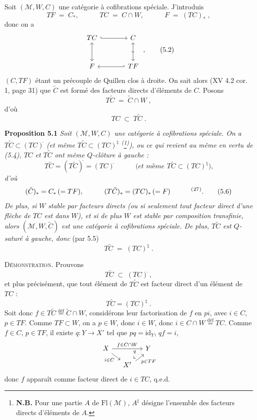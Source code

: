 \documentclass[11pt]{article}
\newcommand{\printedpage}[1]{\marginpar{\footnotesize p.~#1}}
\newcommand{\msp}[1]{\marginpar{\footnotesize [#1]}}
\newcommand{\defeq}{\overset{\text{déf}}{=}}
\newcommand{\fnm}[1]{\textsuperscript{(}\footnotemark[#1]\textsuperscript{)}}
\newcommand{\cl}{^{\tilde{}}}%
\begin{document}
Soit $(\mathcal{M}, W, C)$ une catégorie à cofibrations spéciale. J'introduis
\[
TF \;=\; C_{*}, \qquad\quad TC \;=\; C \cap W, \qquad\quad F \;=\; (TC)_{*} \; ,
\tag*{(5.1)}
\]
donc on a
\[
\begin{tikzcd}[row sep=large, column sep=large]
TC \arrow[r, hook] \arrow[d, leftrightarrow] & C \arrow[d, leftrightarrow, "\shortmid"{marking, sloped}] \\
F & TF \arrow[l, hook']
\end{tikzcd} \; ,
\tag*{(5.2)}
\]
$(C, TF)$ étant un précouple de Quillen clos à droite. On sait alors (XV 4.2 cor. 1, page 31) que $\tilde{C}$ est formé des facteurs directs d'éléments de $C$. Posons
\[
T\tilde{C} \;=\; \tilde{C} \cap W \; ,
\tag*{(5.3)}
\]
d'où
\[
TC \;\subset\; T\tilde{C} \; .
\tag*{(5.4)}
\]

\textbf{Proposition 5.1} \textit{Soit $(\mathcal{M}, W, C)$ une catégorie à cofibrations spéciale. On a $T\tilde{C} \subset (TC)\cl$ (et même $T\tilde{C} \subset (TC)^{\natural}$ \textsuperscript{(}\footnote[26]{\textbf{N.B.} Pour une partie $A$ de $\mathrm{Fl}(\mathcal{M})$, $A^{\natural}$ désigne l'ensemble des facteurs directs d'éléments de $A$.}\textsuperscript{)}), ou ce qui revient au même en vertu de (5.4), $TC$ et $T\tilde{C}$ ont même $Q$-clôture à gauche :}
\[
T\tilde{C} = (T\tilde{C})\cl = (TC)\cl \qquad\quad \textit{(et même } T\tilde{C} \subset (TC)^{\natural}\textit{),}
\tag*{(5.5)}
\]
\printedpage{42}
\textit{d'où}
\[
(\tilde{C})_{*} = C_{*} \, (= TF), \qquad\quad (T\tilde{C})_{*} = (TC)_{*} \, (= F) \qquad\quad \text{\fnm{27}}.
\tag*{(5.6)}
\]
\textit{De plus, si $W$ stable par facteurs directs (ou si seulement tout facteur direct d'une flèche de $TC$ est dans $W$), et si de plus $W$ est stable par composition transfinie, alors $(\mathcal{M}, W, \tilde{C})$ est une catégorie à cofibrations spéciale. De plus, $T\tilde{C}$ est $Q$-saturé à gauche, donc} (par 5.5)
\[
T\tilde{C} \;=\; (TC)^{\natural} \; .
\tag*{(5.7)}
\]

\msp{page 85}

\textsc{Démonstration}. Prouvons
\[
T\tilde{C} \;\subset\; (TC)\cl \, ,
\]
et plus précisément, que tout élément de $T\tilde{C}$ est facteur direct d'un élément de $TC$ :
\[
T\tilde{C} = (TC)^{\natural} \; .
\]
Soit donc $f \in T\tilde{C} \defeq \tilde{C}\cap W$, considérons leur factorisation de $f$ en $pi$, avec $i \in C$, $p \in TF$. Comme $TF \subset W$, on a $p \in W$, donc $i \in W$, donc $i \in C \cap W \defeq TC$. Comme $f \in C$, $p \in TF$, il existe $q : Y \longrightarrow X'$ tel que $pq = \mathrm{id}_Y$, $qf = i$,
\[
\begin{tikzcd}[column sep=small, row sep=small]
X \arrow[rr, "f\in C\cap W"] \arrow[dr, "i\in C"'] & & Y \arrow[dl, dotted, shift right, "q"'] \\
& X' \arrow[ur, shift right, "p\in TF"'] &
\end{tikzcd}
\]
donc $f$ apparaît comme facteur direct de $i \in TC$, q.e.d.
\end{document}

